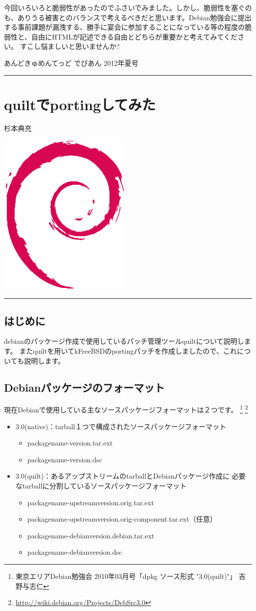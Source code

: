 \documentclass[mingoth,a4paper]{jsarticle}
\renewcommand{\dancersection}[2]{%
\newpage
あんどきゅめんてっど でびあん 2012年夏号
%
\vspace{0.1mm}\\
{\color{dancerdarkblue}\rule{\hsize}{2mm}}

%
%
\begin{minipage}[t]{0.6\hsize}
\color{dancerdarkblue}
\vspace{1cm}
\section{#1}
\hfill{}#2\\
\end{minipage}
\begin{minipage}[t]{0.4\hsize}
\vspace{-2cm}
\hfill{}\includegraphics[height=8cm]{image200502/openlogo-nd.eps}\\
\vspace{-5cm}
\end{minipage}
%
{\color{dancerlightblue}\rule{0.66\hsize}{2mm}}
%
\vspace{2cm}
}
\begin{document}
今回いろいろと脆弱性があったのでふさいでみました。しかし、脆弱性を塞ぐの
も、ありうる被害とのバランスで考えるべきだと思います。Debian勉強会に提出
する事前課題が漏洩する、勝手に宴会に参加することになっている等の程度の脆
弱性と、自由にHTMLが記述できる自由とどちらが重要かと考えてみてください。
すこし悩ましいと思いませんか?

\clearpage

\dancersection{quiltでportingしてみた}{杉本典充}

\subsection{はじめに}

debianのパッケージ作成で使用しているパッチ管理ツールquiltについて説明します。
またquiltを用いてkFreeBSDのportingパッチを作成しましたので、これについても説明します。

\subsection{Debianパッケージのフォーマット}

現在Debianで使用している主なソースパッケージフォーマットは２つです。
\footnote{東京エリアDebian勉強会 2010年03月号「dpkg ソース形式 "3.0(quilt)"」 吉野与志仁}
\footnote{\url{http://wiki.debian.org/Projects/DebSrc3.0}}

\begin{itemize}
 \item{3.0(native)：tarball１つで構成されたソースパッケージフォーマット}
  \begin{itemize}
   \item{packagename-version.tar.ext}
   \item{packagename-version.dsc}
  \end{itemize}
  \item{3.0(quilt)：あるアップストリームのtarballとDebianパッケージ作成に
必要なtarballに分割しているソースパッケージフォーマット}
  \begin{itemize}
   \item{packagename-upstreamversion.orig.tar.ext}
   \item{packagename-upstreamversion.orig-component.tar.ext（任意）}
   \item{packagename-debianversion.debian.tar.ext}
   \item{packagename-debianversion.dsc}
  \end{itemize}
\end{itemize}
\end{document}
